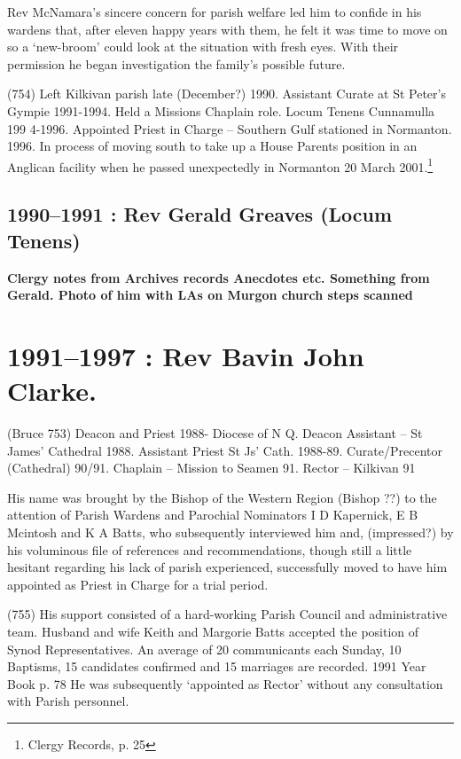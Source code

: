 Rev McNamara's sincere concern for parish welfare led him to confide in
his wardens that, after eleven happy years with them, he felt it was
time to move on so a `new-broom' could look at the situation with fresh
eyes. With their permission he began investigation the family's possible
future.

(754) Left Kilkivan parish late (December?) 1990. Assistant Curate at St
Peter's Gympie 1991-1994. Held a Missions Chaplain role. Locum Tenens
Cunnamulla 199 4-1996. Appointed Priest in Charge -- Southern Gulf
stationed in Normanton. 1996. In process of moving south to take up a
House Parents position in an Anglican facility when he passed
unexpectedly in Normanton 20 March 2001.\footnote{Clergy Records, p. 25}

\section{1990--1991 : Rev Gerald Greaves (Locum
Tenens)}

\textbf{Clergy notes from Archives records Anecdotes etc. Something from
Gerald. Photo of him with LAs on Murgon church steps scanned}

\printendnotes
\setcounter{endnote}{0}
\chapter{1991--1997 : Rev Bavin John
Clarke.}

(Bruce 753) Deacon and Priest 1988- Diocese of N Q. Deacon Assistant --
St James' Cathedral 1988. Assistant Priest St Js' Cath. 1988-89.
Curate/Precentor (Cathedral) 90/91. Chaplain -- Mission to Seamen 91.
Rector -- Kilkivan 91

His name was brought by the Bishop of the Western Region (Bishop ??) to
the attention of Parish Wardens and Parochial Nominators I D Kapernick,
E B Mcintosh and K A Batts, who subsequently interviewed him and,
(impressed?) by his voluminous file of references and recommendations,
though still a little hesitant regarding his lack of parish experienced,
successfully moved to have him appointed as Priest in Charge for a trial
period.

(755) His support consisted of a hard-working Parish Council and
administrative team. Husband and wife Keith and Margorie Batts accepted
the position of Synod Representatives. An average of 20 communicants
each Sunday, 10 Baptisms, 15 candidates confirmed and 15 marriages are
recorded. 1991 Year Book p. 78 He was subsequently `appointed as Rector'
without any consultation with Parish personnel.

